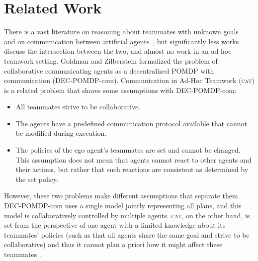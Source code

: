 \documentclass[letterpaper]{article}
\begin{document}

\section{Related Work}
There is a vast literature on reasoning about teammates with unknown goals~\cite{fern2007decision,albrecht2018autonomous} and on communication between artificial agents~\cite{cohen1997team,decker1987distributed,pynadath2002communicative}, but significantly less works discuss the intersection between the two, and almost no work in an ad hoc teamwork setting.
Goldman and Zilberstein  formalized the problem of collaborative communicating agents as a decentralized POMDP with communication (DEC-POMDP-com). 
Communication in Ad-Hoc Teamwork (\textsc{cat}) is a related problem that shares some assumptions with DEC-POMDP-com: 
\begin{itemize}
    \item All teammates strive to be collaborative.
    \item The agents have a predefined communication protocol available that cannot be modified during execution.
    \item The policies of the ego agent's teammates are set and cannot be changed.  This assumption does not mean that agents cannot react to other agents and their actions, but rather that such reactions are consistent as determined by the set policy.
\end{itemize} 
However, these two problems make different assumptions that separate them. DEC-POMDP-com uses a single model jointly representing all plans, and this model is collaboratively controlled by multiple agents. \textsc{cat}, on the other hand, is set from the perspective of one agent with a limited knowledge about its teammates' policies (such as that all agents share the same goal and strive to be collaborative) and thus it cannot plan a priori how it might affect these teammates \cite{stone2013teaching,ravula2019ad}.
\end{document}
